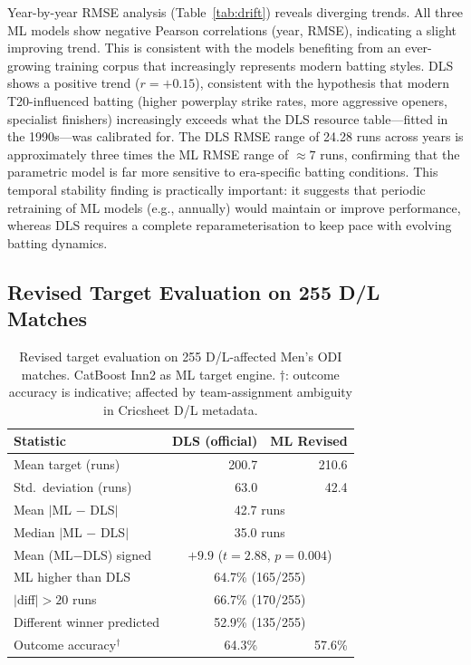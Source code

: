 \documentclass[10pt,a4paper,twocolumn]{article}
\begin{document}
Year-by-year RMSE analysis (Table~\ref{tab:drift}) reveals diverging trends. All three ML models show negative Pearson correlations (year, RMSE), indicating a slight improving trend. This is consistent with the models benefiting from an ever-growing training corpus that increasingly represents modern batting styles. DLS shows a positive trend ($r = +0.15$), consistent with the hypothesis that modern T20-influenced batting (higher powerplay strike rates, more aggressive openers, specialist finishers) increasingly exceeds what the DLS resource table---fitted in the 1990s---was calibrated for. The DLS RMSE range of 24.28 runs across years is approximately three times the ML RMSE range of $\approx 7$ runs, confirming that the parametric model is far more sensitive to era-specific batting conditions. This temporal stability finding is practically important: it suggests that periodic retraining of ML models (e.g., annually) would maintain or improve performance, whereas DLS requires a complete reparameterisation to keep pace with evolving batting dynamics.

\subsection{Revised Target Evaluation on 255 D/L Matches}

\begin{table}[htbp]
\centering
\caption{Revised target evaluation on 255 D/L-affected Men's ODI matches. CatBoost Inn2 as ML target engine. $\dagger$: outcome accuracy is indicative; affected by team-assignment ambiguity in Cricsheet D/L metadata.}
\label{tab:revised_targets}
\small
\begin{tabular}{lrr}
\toprule
\textbf{Statistic} & \textbf{DLS (official)} & \textbf{ML Revised} \\
\midrule
Mean target (runs)           & 200.7 & 210.6 \\
Std.\ deviation (runs)       &  63.0 &  42.4 \\
\midrule
Mean $|$ML $-$ DLS$|$        & \multicolumn{2}{c}{42.7 runs} \\
Median $|$ML $-$ DLS$|$      & \multicolumn{2}{c}{35.0 runs} \\
Mean (ML$-$DLS) signed       & \multicolumn{2}{c}{$+9.9$ ($t=2.88$, $p=0.004$)} \\
ML higher than DLS           & \multicolumn{2}{c}{64.7\% (165/255)} \\
$|$diff$|>20$ runs           & \multicolumn{2}{c}{66.7\% (170/255)} \\
Different winner predicted   & \multicolumn{2}{c}{52.9\% (135/255)} \\
\midrule
Outcome accuracy$^\dagger$   & 64.3\% & 57.6\% \\
\bottomrule
\end{tabular}
\end{table}
\end{document}
